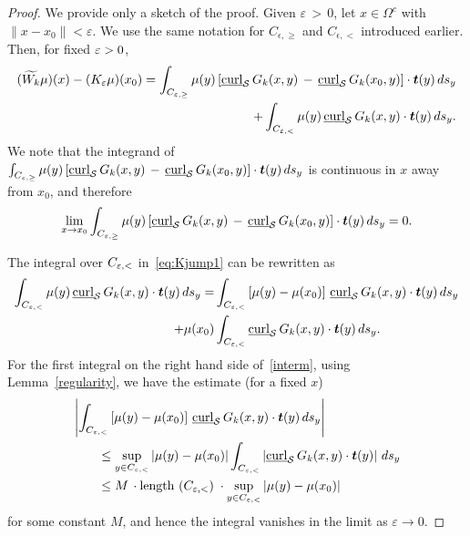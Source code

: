\begin{proof}
We provide only a sketch of the proof.  Given $\varepsilon \, > \,0$,
let $x\in \Omega^{c}$ with $ \| x-x_0\|<\varepsilon$.   We use the same
notation for $C_{\epsilon,\geq}$ and $C_{\epsilon,<}$ introduced
earlier.  Then, for fixed $\varepsilon>0$, 
\begin{align}
  (\widetilde{W_k}\mu)(x)-(K_{\varepsilon} \mu)(x_0) = 
  \int_{C_{\e,\geq}}\mu(y)\left[\underline{\mbox{curl}}_{\S}\, 
  G_{k}(x,y)\,-\,\underline{\mbox{curl}}_{\S}\,G_k(x_{0},y)
  \right]\cdot\vec{t}(y)\, ds_{y} \nonumber\\
  +\int_{C_{\e,<}} \mu(y)\,\underline{\mbox{curl}}_{\S}\,
  G_k(x,y)\cdot\vec{t}(y)\,ds_{y}.
  \label{eq:Kjump1}
\end{align}
We note that the integrand of $\int_{C_{\e,\geq}} \mu(y)
\left[\underline{\mbox{curl}}_{\S}\,
G_k(x,y)\,-\,\underline{\mbox{curl}}_{\S}\,G_k(x_0,y)\right]\cdot\vec{t}(y)\,
ds_{y}$ is continuous in $x$ away from  $x_0$, and therefore 
\begin{align*}
  \lim_{x\rightarrow x_0}  \int_{C_{\e,\geq}}
  \mu(y)\left[\underline{\mbox{curl}}_{\S}\,
  G_{k}(x,y)\,-\,\underline{\mbox{curl}}_{\S}\,
  G_{k}(x_{0},y)\right]\cdot\vec{t}(y)\,ds_{y} = 0.
\end{align*}

The integral over $C_{\varepsilon,<}$ in~\eqref{eq:Kjump1} can be rewritten as
\begin{align}
  \int_{C_{\e,<}} \mu(y)\,\underline{\mbox{curl}}_{\S}\,
    G_k(x,y)\cdot\vec{t}(y)\,ds_{y} 
  = &\int_{C_{\e,<}} \left[\mu(y)-\mu(x_0)\right]\,
    \underline{\mbox{curl}}_{\S}\,G_k(x,y)\cdot\vec{t}(y)\,ds_{y}
    \nonumber \\
  + \mu(x_0)&\int_{C_{\e,<}} \underline{\mbox{curl}}_{\S}\,
    G_k(x,y)\cdot\vec{t}(y)\,ds_{y}.
  \label{interm}
\end{align}
For the first integral on the right hand side of~\eqref{interm}, using
Lemma~\ref{regularity}, we have the estimate (for a fixed $x$)
\begin{align*}
  &\left|\int_{C_{\e,<}} \left[\mu(y)-\mu(x_0)\right]\,
  \underline{\mbox{curl}}_{\S}\,G_k(x,y)\cdot\vec{t}(y)
  \,ds_{y}\right| \\
  &\qquad \leq \sup_{y \in C_{\e,<}} |\mu(y)-\mu(x_0)|
  \int_{C_{\e,<}} \left|\underline{\mbox{curl}}_{\S}\,
  G_k(x,y)\cdot\vec{t}(y)\right|\,ds_{y}\\
  &\qquad \leq M\,\cdot \mbox{length $(C_{\e,<})$}\;
  \cdot \sup_{y \in C_{\e,<}} |\mu(y)-\mu(x_0)|
\end{align*}
for some constant $M$, and hence the integral vanishes in the limit as
$\varepsilon\longrightarrow 0$.


\end{proof}
